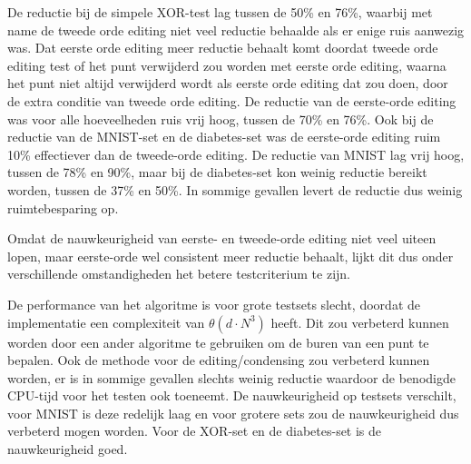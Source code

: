 \documentclass{article}
\begin{document}
De reductie bij de simpele XOR-test lag tussen de 50\% en 76\%, waarbij met name de tweede orde editing niet veel reductie behaalde als er enige ruis aanwezig was. Dat eerste orde editing meer reductie behaalt komt doordat tweede orde editing test of het punt verwijderd zou worden met eerste orde editing, waarna het punt niet altijd verwijderd wordt als eerste orde editing dat zou doen, door de extra conditie van tweede orde editing. De reductie van de eerste-orde editing was voor alle hoeveelheden ruis vrij hoog, tussen de 70\% en 76\%. Ook bij de reductie van de MNIST-set en de diabetes-set was de eerste-orde editing ruim 10\% effectiever dan de tweede-orde editing. De reductie van MNIST lag vrij hoog, tussen de 78\% en 90\%, maar bij de diabetes-set kon weinig reductie bereikt worden, tussen de 37\% en 50\%. In sommige gevallen levert de reductie dus weinig ruimtebesparing op.

Omdat de nauwkeurigheid van eerste- en tweede-orde editing niet veel uiteen lopen, maar eerste-orde wel consistent meer reductie behaalt, lijkt dit dus onder verschillende omstandigheden het betere testcriterium te zijn.

De performance van het algoritme is voor grote testsets slecht, doordat de implementatie een complexiteit van $\theta (d\cdot N^3)$ heeft. Dit zou verbeterd kunnen worden door een ander algoritme te gebruiken om de buren van een punt te bepalen. Ook de methode voor de editing/condensing zou verbeterd kunnen worden, er is in sommige gevallen slechts weinig reductie waardoor de benodigde CPU-tijd voor het testen ook toeneemt. De nauwkeurigheid op testsets verschilt, voor MNIST is deze redelijk laag en voor grotere sets zou de nauwkeurigheid dus verbeterd mogen worden. Voor de XOR-set en de diabetes-set is de nauwkeurigheid goed.
\end{document}

